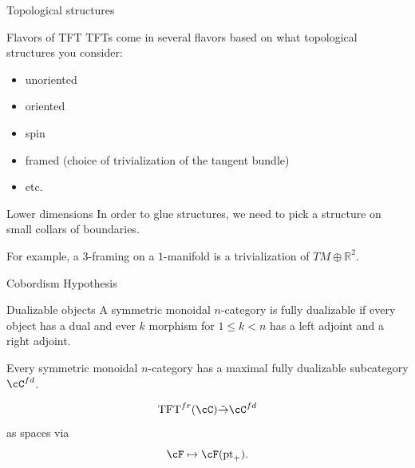 \documentclass[beamer]{beamer}
\begin{document}
\begin{frame}{Topological structures}

\begin{block}{Flavors of TFT}
TFTs come in several flavors based on what topological structures you consider:
\begin{itemize}
\item unoriented
\item oriented
\item spin
\item framed (choice of trivialization of the tangent bundle)
\item etc.
\end{itemize}
\end{block}

\begin{block}{Lower dimensions}
In order to glue structures, we need to pick a structure on small collars of boundaries.

For example, a $3$-framing on a $1$-manifold is a trivialization of $TM \oplus \mathbb{R}^2$.
\end{block}

\end{frame}

\begin{frame}{Cobordism Hypothesis}

\begin{block}{Dualizable objects}
A symmetric monoidal $n$-category is fully dualizable if every object has a dual and ever $k$ morphism for $1 \leq k < n$ has a left adjoint and a right adjoint.  

Every symmetric monoidal $n$-category has a maximal fully dualizable subcategory $\cC^{fd}$.
\end{block}

\begin{theorem}
$$\mathrm{TFT}^{fr}(\cC) \tilde{\rightarrow} \cC^{fd}$$ as spaces via $$\cF \mapsto \cF(\mathrm{pt}_+).$$
\end{theorem}
\end{frame}
\end{document}
